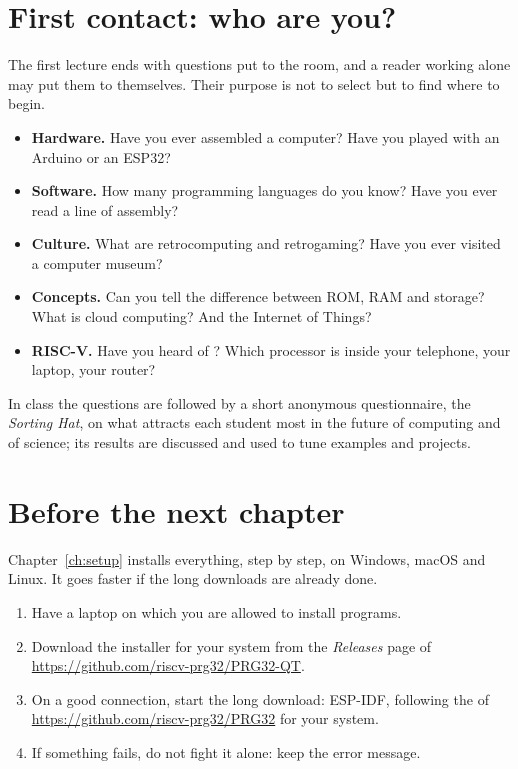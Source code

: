 \section{First contact: who are you?}

The first lecture ends with questions put to the room, and a reader working
alone may put them to themselves. Their purpose is not to select but
to find where to begin.

\begin{itemize}
\item \textbf{Hardware.} Have you ever assembled a computer? Have you played
  with an Arduino or an ESP32?
\item \textbf{Software.} How many programming languages do you know? Have you
  ever read a line of assembly?
\item \textbf{Culture.} What are retrocomputing and retrogaming? Have you ever
  visited a computer museum?
\item \textbf{Concepts.} Can you tell the difference between ROM, RAM and
  storage? What is cloud computing? And the Internet of Things?
\item \textbf{RISC-V.} Have you heard of \riscv? Which processor is inside your
  telephone, your laptop, your router?
\end{itemize}

In class the questions are followed by a short anonymous questionnaire, the
\emph{Sorting Hat}, on what attracts each student most in the future of
computing and of science; its results are discussed and used to tune examples
and projects.



\section{Before the next chapter}

Chapter~\ref{ch:setup} installs everything, step by step, on Windows, macOS
and Linux. It goes faster if the long downloads are already done.

\begin{exercise}[preparation]
\begin{enumerate}[nosep]
\item Have a laptop on which you are allowed to install programs.
\item Download the \prgqt installer for your system from the \emph{Releases}
  page of \url{https://github.com/riscv-prg32/PRG32-QT}.
\item On a good connection, start the long download: ESP-IDF, following the
   of \url{https://github.com/riscv-prg32/PRG32} for your system.
\item If something fails, do not fight it alone: keep the error message.
\end{enumerate}
\end{exercise}



